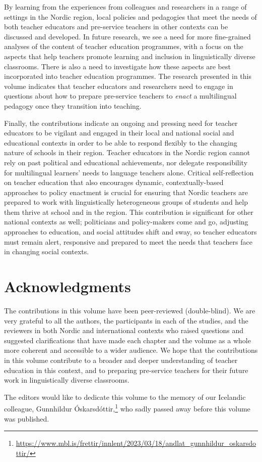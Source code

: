 \documentclass[output=paper]{langscibook}
\begin{document}
By learning from the experiences from colleagues and researchers in a range of settings in the Nordic region, local policies and pedagogies that meet the needs of both teacher educators and pre-service teachers in other contexts can be discussed and developed. In future research, we see a need for more fine-grained analyses of the content of teacher education programmes, with a focus on the aspects that help teachers promote learning and inclusion in linguistically diverse classrooms. There is also a need to investigate how these aspects are best incorporated into teacher education programmes. The research presented in this volume indicates that teacher educators and researchers need to engage in questions about how to prepare pre-service teachers to \textit{enact} a multilingual pedagogy once they transition into teaching. 

Finally, the contributions indicate an ongoing and pressing need for teacher educators to be vigilant and engaged in their local and national social and educational contexts in order to be able to respond flexibly to the changing nature of schools in their region. Teacher educators in the Nordic region cannot rely on past political and educational achievements, nor delegate responsibility for multilingual learners’ needs to language teachers alone. Critical self-reflection on teacher education that also encourages dynamic, contextually-based approaches to policy enactment is crucial for ensuring that Nordic teachers are prepared to work with linguistically heterogeneous groups of students and help them thrive at school and in the region. This contribution is significant for other national contexts as well; politicians and policy-makers come and go, adjusting approaches to education, and social attitudes shift and sway, so teacher educators must remain alert, responsive and prepared to meet the needs that teachers face in changing social contexts.

\section*{Acknowledgments}

The contributions in this volume have been peer-reviewed (double-blind). We are very grateful to all the authors, the participants in each of the studies, and the reviewers in both Nordic and international contexts who raised questions and suggested clarifications that have made each chapter and the volume as a whole more coherent and accessible to a wider audience. We hope that the contributions in this volume contribute to a broader and deeper understanding of teacher education in this context, and to preparing pre-service teachers for their future work in linguistically diverse classrooms.

The editors would like to dedicate this volume to the memory of our Icelandic colleague, Gunnhildur Óskarsdóttir,\footnote{\url{https://www.mbl.is/frettir/innlent/2023/03/18/andlat_gunnhildur_oskarsdottir/}} who sadly passed away before this volume was published.

\printbibliography[heading=subbibliography,notkeyword=this]
\end{document}
